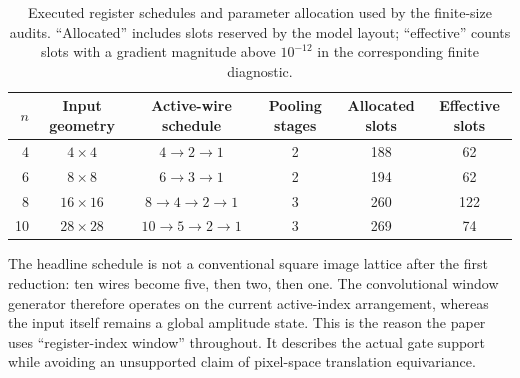 \documentclass[conference]{IEEEtran}
\begin{document}
\begin{table}[!t]
\caption{Executed register schedules and parameter allocation used by the finite-size audits. ``Allocated'' includes slots reserved by the model layout; ``effective'' counts slots with a gradient magnitude above $10^{-12}$ in the corresponding finite diagnostic.}
\label{tab:schedule}
\centering
\small
\begin{tabular}{@{}rccccc@{}}
\toprule
\textbf{$n$} & \textbf{Input geometry} & \textbf{Active-wire schedule} & \textbf{Pooling stages} & \textbf{Allocated slots} & \textbf{Effective slots} \\
\midrule
4 & $4\times4$ & $4\rightarrow2\rightarrow1$ & 2 & 188 & 62 \\
6 & $8\times8$ & $6\rightarrow3\rightarrow1$ & 2 & 194 & 62 \\
8 & $16\times16$ & $8\rightarrow4\rightarrow2\rightarrow1$ & 3 & 260 & 122 \\
10 & $28\times28$ & $10\rightarrow5\rightarrow2\rightarrow1$ & 3 & 269 & 74 \\
\bottomrule
\end{tabular}
\end{table}

The headline schedule is not a conventional square image lattice after the
first reduction: ten wires become five, then two, then one. The convolutional
window generator therefore operates on the current active-index arrangement,
whereas the input itself remains a global amplitude state. This is the reason
the paper uses ``register-index window'' throughout. It describes the actual
gate support while avoiding an unsupported claim of pixel-space translation
equivariance.
\end{document}
